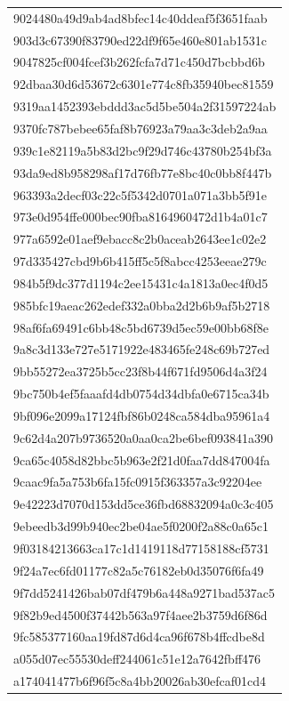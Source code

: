 \begin{tabular}{l}
9024480a49d9ab4ad8bfec14c40ddeaf5f3651faab \\
903d3c67390f83790ed22df9f65e460e801ab1531c \\
9047825cf004fcef3b262fcfa7d71c450d7bcbbd6b \\
92dbaa30d6d53672c6301e774c8fb35940bec81559 \\
9319aa1452393ebddd3ac5d5be504a2f31597224ab \\
9370fc787bebee65faf8b76923a79aa3c3deb2a9aa \\
939c1e82119a5b83d2bc9f29d746c43780b254bf3a \\
93da9ed8b958298af17d76fb77e8bc40c0bb8f447b \\
963393a2decf03c22c5f5342d0701a071a3bb5f91e \\
973e0d954ffe000bec90fba8164960472d1b4a01c7 \\
977a6592e01aef9ebacc8c2b0aceab2643ee1c02e2 \\
97d335427cbd9b6b415ff5c5f8abcc4253eeae279c \\
984b5f9dc377d1194c2ee15431c4a1813a0ec4f0d5 \\
985bfc19aeac262edef332a0bba2d2b6b9af5b2718 \\
98af6fa69491c6bb48c5bd6739d5ec59e00bb68f8e \\
9a8c3d133e727e5171922e483465fe248c69b727ed \\
9bb55272ea3725b5cc23f8b44f671fd9506d4a3f24 \\
9bc750b4ef5faaafd4db0754d34dbfa0e6715ca34b \\
9bf096e2099a17124fbf86b0248ca584dba95961a4 \\
9c62d4a207b9736520a0aa0ca2be6bef093841a390 \\
9ca65c4058d82bbc5b963e2f21d0faa7dd847004fa \\
9caac9fa5a753b6fa15fc0915f363357a3c92204ee \\
9e42223d7070d153dd5ce36fbd68832094a0c3c405 \\
9ebeedb3d99b940ec2be04ae5f0200f2a88c0a65c1 \\
9f03184213663ca17c1d1419118d77158188cf5731 \\
9f24a7ec6fd01177c82a5c76182eb0d35076f6fa49 \\
9f7dd5241426bab07df479b6a448a9271bad537ac5 \\
9f82b9ed4500f37442b563a97f4aee2b3759d6f86d \\
9fc585377160aa19fd87d6d4ca96f678b4ffcdbe8d \\
a055d07ec55530deff244061c51e12a7642fbff476 \\
a174041477b6f96f5c8a4bb20026ab30efcaf01cd4 \\

\end{tabular}

